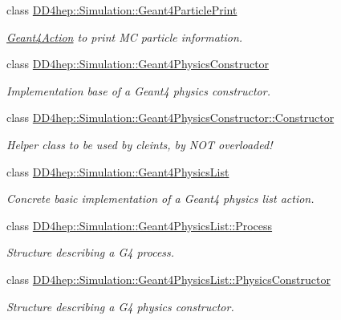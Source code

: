 \begin{DoxyCompactItemize}
class \hyperlink{class_d_d4hep_1_1_simulation_1_1_geant4_particle_print}{DD4hep::Simulation::Geant4ParticlePrint}
\begin{DoxyCompactList}\small\item\em \hyperlink{class_d_d4hep_1_1_simulation_1_1_geant4_action}{Geant4Action} to print MC particle information. \item\end{DoxyCompactList}\item 
class \hyperlink{class_d_d4hep_1_1_simulation_1_1_geant4_physics_constructor}{DD4hep::Simulation::Geant4PhysicsConstructor}
\begin{DoxyCompactList}\small\item\em Implementation base of a Geant4 physics constructor. \item\end{DoxyCompactList}\item 
class \hyperlink{class_d_d4hep_1_1_simulation_1_1_geant4_physics_constructor_1_1_constructor}{DD4hep::Simulation::Geant4PhysicsConstructor::Constructor}
\begin{DoxyCompactList}\small\item\em Helper class to be used by cleints, by NOT overloaded! \item\end{DoxyCompactList}\item 
class \hyperlink{class_d_d4hep_1_1_simulation_1_1_geant4_physics_list}{DD4hep::Simulation::Geant4PhysicsList}
\begin{DoxyCompactList}\small\item\em Concrete basic implementation of a Geant4 physics list action. \item\end{DoxyCompactList}\item 
class \hyperlink{class_d_d4hep_1_1_simulation_1_1_geant4_physics_list_1_1_process}{DD4hep::Simulation::Geant4PhysicsList::Process}
\begin{DoxyCompactList}\small\item\em Structure describing a G4 process. \item\end{DoxyCompactList}\item 
class \hyperlink{class_d_d4hep_1_1_simulation_1_1_geant4_physics_list_1_1_physics_constructor}{DD4hep::Simulation::Geant4PhysicsList::PhysicsConstructor}
\begin{DoxyCompactList}\small\item\em Structure describing a G4 physics constructor. \item\end{DoxyCompactList}\item 

\end{DoxyCompactItemize}
